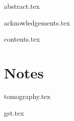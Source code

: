 \documentclass{bris}
\begin{document}

\maketitle

\frontmatter

\makedecl

{abstract.tex}

{acknowledgements.tex}

{contents.tex}
\cleardoublepage

\mainmatter


\chapter{Notes}

{tomography.tex}

{gst.tex}

\backmatter



\end{document}
